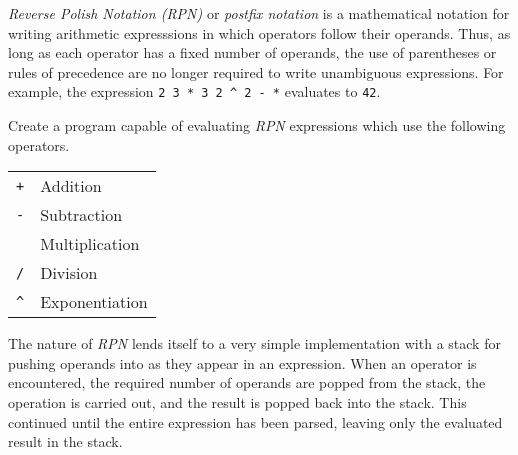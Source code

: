 

\problem \textit{Reverse Polish Notation (RPN)} or \textit{postfix notation} is a mathematical notation for writing arithmetic expresssions in which
operators follow their operands. Thus, as long as each operator has a fixed number of operands, the use of parentheses or rules of
precedence are no longer required to write unambiguous expressions. For example, the expression \texttt{2 3 * 3 2 \^{} 2 - *} evaluates to \texttt{42}.

Create a program capable of evaluating \textit{RPN} expressions which use the following operators.
\begin{center}
\begin{tabular}{c|l}
	{\tt +} & Addition \\
	{\tt -} & Subtraction \\
	{\tt *} & Multiplication \\
	{\tt /} & Division \\
	{\tt \^{}} & Exponentiation
\end{tabular}
\end{center}

\solution The nature of \textit{RPN} lends itself to a very simple implementation with a stack for pushing operands into as they appear
in an expression. When an operator is encountered, the required number of operands are popped from the stack, the operation is carried out,
and the result is popped back into the stack. This continued until the entire expression has been parsed, leaving only the evaluated result
in the stack.

